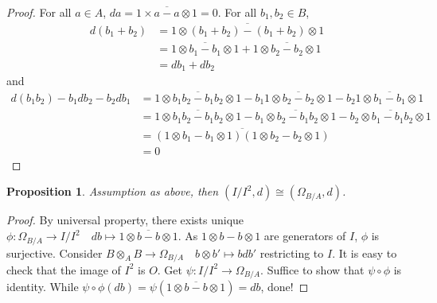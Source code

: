 \documentclass{ctexart}
\newtheorem{proposition}{Proposition}[section]
\begin{document}
\begin{proof}
    For all $a\in A$, $da = \overline{1 \times a - a \otimes 1} = 0$.
    For all $b_{1},b_{2}\in B$, 
    \begin{equation*}
        \begin{split}
            d(b_{1} + b_{2}) & = \overline{1 \otimes (b_{1} + b_{2}) - (b_{1} + b_{2}) \otimes 1} \\
            & = \overline{1 \otimes b_{1} - b_{1} \otimes 1} + \overline{1 \otimes b_{2} - b_{2} \otimes 1} \\
            & = db_{1} + db_{2}
        \end{split}
    \end{equation*}
    and
    \begin{equation*}
        \begin{split}
            d(b_{1}b_{2}) - b_{1}db_{2} - b_{2}db_{1} & = \overline{1 \otimes b_{1}b_{2} - b_{1}b_{2} \otimes 1} - b_{1}\overline{1 \otimes b_{2} - b_{2} \otimes 1} - b_{2}\overline{1 \otimes b_{1} - b_{1} \otimes 1} \\
            & = \overline{1 \otimes b_{1}b_{2} - b_{1}b_{2} \otimes 1} - \overline{b_{1} \otimes b_{2} - b_{1}b_{2} \otimes 1} - \overline{b_{2} \otimes b_{1} - b_{1}b_{2} \otimes 1} \\
            & = \overline{(1 \otimes b_{1} - b_{1} \otimes 1)(1 \otimes b_{2} - b_{2} \otimes 1)} \\
            & = 0
        \end{split}
    \end{equation*}
\end{proof}
\begin{proposition}
    Assumption as above, then $(I/I^{2}, d) \cong (\Omega_{B/A}, d)$.
    \label{Proposition 9.2}
\end{proposition}
\begin{proof}
    By universal property, there exists unique $\phi: \Omega_{B/A} \longrightarrow I/I^{2}\quad db \longmapsto \overline{1 \otimes b - b \otimes 1}$.
    As $1 \otimes b - b \otimes 1$ are generators of $I$, $\phi$ is surjective.
    Consider $B \otimes_{A} B \longrightarrow \Omega_{B/A}\quad b \otimes b' \longmapsto bdb'$ restricting to $I$.
    It is easy to check that the image of $I^{2}$ is $O$.
    Get $\psi: I/I^{2} \longrightarrow \Omega_{B/A}$.
    Suffice to show that $\psi \circ \phi$ is identity.
    While $\psi \circ \phi(db) = \psi(\overline{1 \otimes b - b \otimes 1}) = db$, done!
\end{proof}
\end{document}
